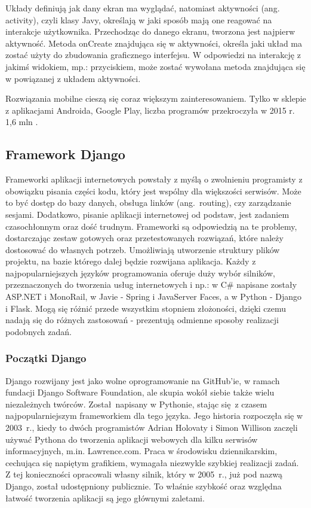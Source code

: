 Układy definiują jak dany ekran ma wyglądać, natomiast aktywności (ang. activity), czyli klasy Javy, określają w jaki sposób mają one reagować na interakcje użytkownika. Przechodząc do danego ekranu, tworzona jest najpierw aktywność. Metoda onCreate znajdująca się w aktywności, określa jaki układ ma zostać użyty do zbudowania graficznego interfejsu. W odpowiedzi na interakcję z jakimś widokiem, mp.: przyciskiem, może zostać wywołana metoda znajdująca się w powiązanej z układem aktywności.

Rozwiązania mobilne cieszą się coraz większym zainteresowaniem. Tylko w sklepie z aplikacjami Androida, Google Play, liczba programów przekroczyła w 2015 r. 1,6 mln \cite{biblia_ebiznesu_2}.

\subsection{Framework Django}
Frameworki aplikacji internetowych powstały z myślą o zwolnieniu programisty z obowiązku pisania części kodu, który jest wspólny dla większości serwisów. Może to być dostęp do bazy danych, obsługa linków (ang.~routing), czy zarządzanie sesjami. Dodatkowo, pisanie aplikacji internetowej od podstaw, jest zadaniem czasochłonnym oraz dość trudnym. Frameworki są odpowiedzią na te problemy, dostarczając zestaw gotowych oraz przetestowanych rozwiązań, które należy dostosować do własnych potrzeb. Umożliwiają utworzenie struktury plików projektu, na bazie którego dalej będzie rozwijana aplikacja. Każdy z najpopularniejszych języków programowania oferuje duży wybór silników, przeznaczonych do tworzenia usług internetowych i np.: w C\# napisane zostały ASP.NET i MonoRail, w Javie - Spring i JavaServer Faces, a w Python - Django i Flask. Mogą się różnić przede wszystkim stopniem złożoności, dzięki czemu nadają się do różnych zastosowań - prezentują odmienne sposoby realizacji podobnych zadań.

\subsubsection*{Początki Django}
Django rozwijany jest jako wolne oprogramowanie na GitHub'ie, w ramach fundacji Django Software Foundation, ale skupia wokół siebie także wielu niezależnych twórców. Został napisany w Pythonie, stając się z czasem najpopularniejszym frameworkiem dla tego języka. Jego historia rozpoczęła się w 2003~r., kiedy to dwóch programistów Adrian Holovaty i Simon Willison zaczęli używać Pythona do tworzenia aplikacji webowych dla kilku serwisów informacyjnych, m.in. Lawrence.com. Praca w środowisku dziennikarskim, cechująca się napiętym grafikiem, wymagała niezwykle szybkiej realizacji zadań. Z tej konieczności opracowali własny silnik, który w 2005~r., już pod nazwą Django, został udostępniony publicznie. To właśnie szybkość oraz względna łatwość tworzenia aplikacji są jego głównymi zaletami.

